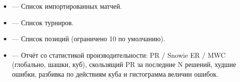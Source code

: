 \documentclass[letterpaper,10pt,russian]{sphinxmanual}
\begin{document}
\sphinxAtStartPar
{}
\begin{itemize}
\item {} 
\sphinxAtStartPar
{} — Список импортированных матчей.

\item {} 
\sphinxAtStartPar
{} — Список турниров.

\item {} 
\sphinxAtStartPar
{} — Список позиций (ограничено 10 по умолчанию).

\item {} 
\sphinxAtStartPar
{} — Отчёт со статистикой производительности: PR / Snowie ER / MWC (глобально, шашки, куб), скользящий PR за последние N решений, худшие ошибки, разбивка по действиям куба и гистограмма величин ошибок.

\end{itemize}
\end{document}
